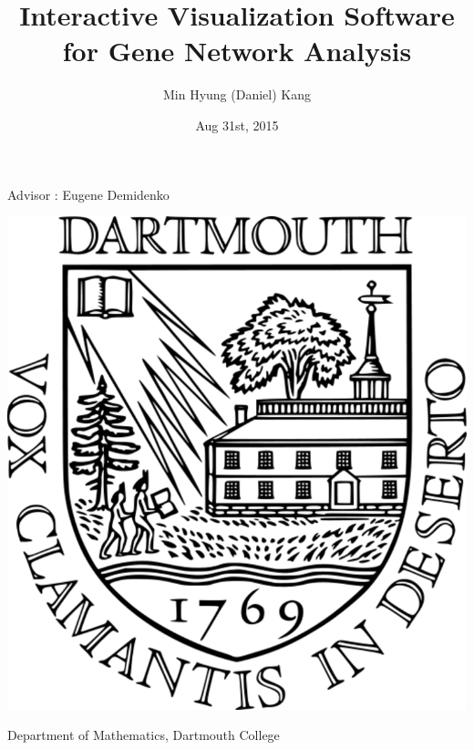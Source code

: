 \documentclass[]{article}
\begin{document}



\title{Interactive Visualization Software for           \linebreak Gene Network Analysis }
\author{Min Hyung (Daniel) Kang}
\date{Aug 31st, 2015}
\maketitle

\begin{center}

Advisor : Eugene Demidenko

\bigskip \bigskip \bigskip 
 \bigskip \bigskip \bigskip
 
\includegraphics[scale=0.2]{logo}
\bigskip

Department of Mathematics, Dartmouth College
 \bigskip \bigskip \bigskip 

\end{center}


\restoregeometry
{}



\pagebreak

\doublespacing
\end{document}

